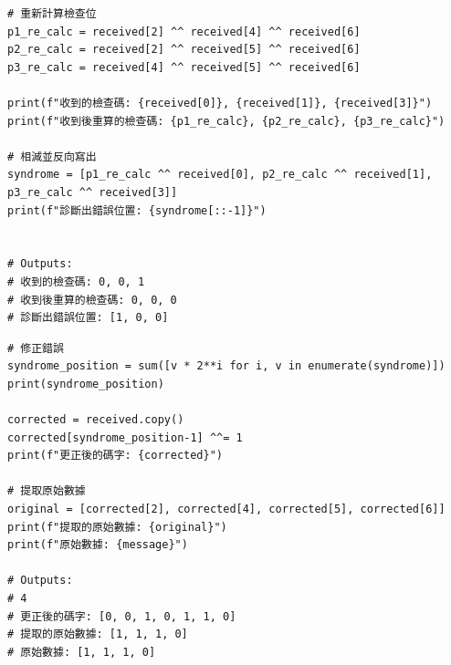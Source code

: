 \documentclass[
]{article}
\begin{document}
\begin{verbatim}
# 重新計算檢查位
p1_re_calc = received[2] ^^ received[4] ^^ received[6]
p2_re_calc = received[2] ^^ received[5] ^^ received[6]
p3_re_calc = received[4] ^^ received[5] ^^ received[6]

print(f"收到的檢查碼: {received[0]}, {received[1]}, {received[3]}")
print(f"收到後重算的檢查碼: {p1_re_calc}, {p2_re_calc}, {p3_re_calc}")

# 相減並反向寫出
syndrome = [p1_re_calc ^^ received[0], p2_re_calc ^^ received[1], p3_re_calc ^^ received[3]]
print(f"診斷出錯誤位置: {syndrome[::-1]}")


# Outputs:
# 收到的檢查碼: 0, 0, 1
# 收到後重算的檢查碼: 0, 0, 0
# 診斷出錯誤位置: [1, 0, 0]

\end{verbatim}

\begin{verbatim}
# 修正錯誤
syndrome_position = sum([v * 2**i for i, v in enumerate(syndrome)])
print(syndrome_position)

corrected = received.copy()
corrected[syndrome_position-1] ^^= 1
print(f"更正後的碼字: {corrected}")

# 提取原始數據
original = [corrected[2], corrected[4], corrected[5], corrected[6]]
print(f"提取的原始數據: {original}")
print(f"原始數據: {message}")

# Outputs:
# 4
# 更正後的碼字: [0, 0, 1, 0, 1, 1, 0]
# 提取的原始數據: [1, 1, 1, 0]
# 原始數據: [1, 1, 1, 0]
\end{verbatim}
\end{document}
